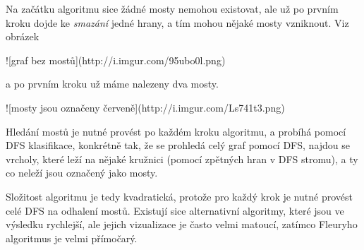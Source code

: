 \documentclass{article}
\begin{document}
Na začátku algoritmu sice žádné mosty nemohou existovat, ale už po
prvním kroku dojde ke \emph{smazání} jedné hrany, a tím mohou nějaké mosty
vzniknout. Viz obrázek

![graf bez mostů](http://i.imgur.com/95ubo0l.png)

a po prvním kroku už máme nalezeny dva mosty.

![mosty jsou označeny červeně](http://i.imgur.com/Ls741t3.png)

Hledání mostů je nutné provést po každém kroku algoritmu, a probíhá
pomocí DFS klasifikace, konkrétně tak, že se prohledá celý graf pomocí
DFS, najdou se vrcholy, které leží na nějaké kružnici (pomocí zpětných
hran v DFS stromu), a ty co neleží jsou označený jako mosty.

Složitost algoritmu je tedy kvadratická, protože pro každý krok je nutné
provést celé DFS na odhalení mostů. Existují sice alternativní
algoritmy, které jsou ve výsledku rychlejší, ale jejich vizualizace je
často velmi matoucí, zatímco Fleuryho algoritmus je velmi přímočarý.
	
\end{document}
